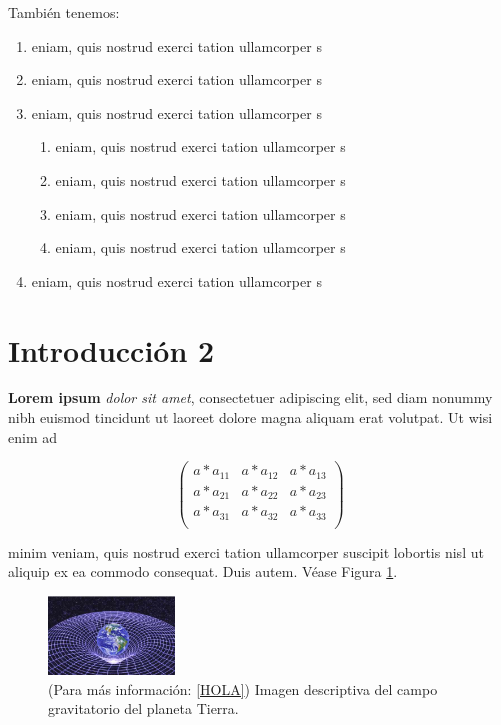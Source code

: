 \documentclass[a4paper, 11pt, titlepage, twocolumn]{book}
\begin{document}
También tenemos:

\begin{enumerate}
    \item eniam, quis nostrud exerci tation ullamcorper s
    \item eniam, quis nostrud exerci tation ullamcorper s
    \item eniam, quis nostrud exerci tation ullamcorper s
    \begin{enumerate}
        \item eniam, quis nostrud exerci tation ullamcorper s
        \item eniam, quis nostrud exerci tation ullamcorper s
        \item eniam, quis nostrud exerci tation ullamcorper s
        \item eniam, quis nostrud exerci tation ullamcorper s
    \end{enumerate}
    \item eniam, quis nostrud exerci tation ullamcorper s
\end{enumerate}

\section{Introducción 2} \label{introduction2}

\textbf{Lorem ipsum} \textit{dolor sit amet}, consectetuer 
adipiscing elit, sed diam nonummy nibh euismod tincidunt ut 
laoreet dolore magna aliquam erat volutpat. Ut wisi enim ad 

\[
    \begin{pmatrix}
        a*a_{11} & a*a_{12} & a*a_{13} \\ 
        a*a_{21} & a*a_{22} & a*a_{23} \\
        a*a_{31} & a*a_{32} & a*a_{33} \\
    \end{pmatrix}  
\]

minim veniam, quis nostrud exerci tation ullamcorper suscipit 
lobortis nisl ut aliquip ex ea commodo consequat. Duis autem. Véase Figura \ref{imagenGravedad}.

\begin{figure}[htp]
    \centering
    \includegraphics[width=0.3\textwidth]{imagen.jpeg}
    \caption{(Para más información: \ref{HOLA}) Imagen descriptiva del campo gravitatorio del planeta Tierra.}
    \label{imagenGravedad}
\end{figure}
\end{document}
